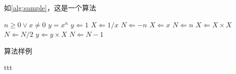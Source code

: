 \par 如\autoref{alg:sample}，这是一个算法

\begin{algorithm}[H]
    \begin{algorithmic} %
        \REQUIRE $n \geq 0 \vee x \neq 0$
        \ENSURE $y = x^n$
        \STATE $y \Leftarrow 1$
            \STATE $X \Leftarrow 1 / x$
            \STATE $N \Leftarrow -n$
        \ELSE
            \STATE $X \Leftarrow x$
            \STATE $N \Leftarrow n$
        \ENDIF
                \STATE $X \Leftarrow X \times X$
                \STATE $N \Leftarrow N / 2$
            \ELSE[$N$ is odd]
                \STATE $y \Leftarrow y \times X$
                \STATE $N \Leftarrow N - 1$
            \ENDIF
        \ENDWHILE
    \end{algorithmic}
    \caption{\label{alg:sample}算法样例}
\end{algorithm}


ttt